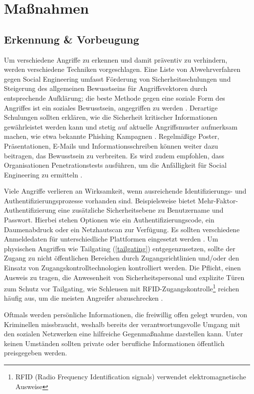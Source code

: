 \chapter{Maßnahmen}
\label{chapter:massnahmen}

\section{Erkennung \& Vorbeugung}

Um verschiedene Angriffe zu erkennen und damit präventiv zu verhindern, werden verschiedene Techniken vorgeschlagen.
Eine Liste von Abwehrverfahren gegen Social Engineering umfasst Förderung von Sicherheitsschulungen und Steigerung des allgemeinen Bewusstseins für Angriffsvektoren durch entsprechende Aufklärung;
die beste Methode gegen eine soziale Form des Angriffes ist ein soziales Bewusstsein, angegriffen zu werden .
Derartige Schulungen sollten erklären, wie die Sicherheit kritischer Informationen gewährleistet werden kann und stetig auf aktuelle Angriffsmuster aufmerksam machen, wie etwa bekannte Phishing Kampagnen .
Regelmäßige Poster, Präsentationen, E-Mails und Informationsschreiben können weiter dazu beitragen, das Bewusstsein zu verbreiten.
Es wird zudem empfohlen, dass Organisationen Penetrationstests ausführen, um die Anfälligkeit für Social Engineering zu ermitteln .

Viele Angriffe verlieren an Wirksamkeit, wenn ausreichende Identifizierungs- und Authentifizierungsprozesse vorhanden sind.
Beispielsweise bietet Mehr-Faktor-Authentifizierung eine zusätzliche Sicherheitsebene zu Benutzername und Passwort.
Hierbei stehen Optionen wie ein Authentifizierungscode, ein Daumenabdruck oder ein Netzhautscan zur Verfügung.
Es sollten verschiedene Anmeldedaten für unterschiedliche Plattformen eingesetzt werden .
Um physischen Angriffen wie Tailgating (\autoref{tailgating}) entgegenzusetzen, sollte der Zugang zu nicht öffentlichen Bereichen durch Zugangsrichtlinien und/oder den Einsatz von Zugangskontrolltechnologien kontrolliert werden.
Die Pflicht, einen Ausweis zu tragen, die Anwesenheit von Sicherheitspersonal und explizite Türen zum Schutz vor Tailgating,
wie Schleusen mit RFID-Zugangskontrolle\footnote{RFID (Radio Frequency Identification signals) verwendet elektromagnetische Ausweise} reichen häufig aus, um die meisten Angreifer abzuschrecken .

Oftmals werden persönliche Informationen, die freiwillig offen gelegt wurden, von Kriminellen missbraucht, weshalb bereits der verantwortungsvolle Umgang mit den sozialen Netzwerken eine hilfreiche Gegenmaßnahme darstellen kann.
Unter keinen Umständen sollten private oder berufliche Informationen öffentlich preisgegeben werden.


